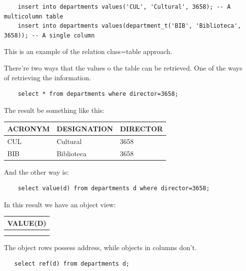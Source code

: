 \begin{lstlisting}
    insert into departments values('CUL', 'Cultural', 3658); -- A multicolumn table
    insert into departments values(department_t('BIB', 'Biblioteca', 3658)); -- A single column
\end{lstlisting}

This is an example of the relation class=table approach. 

There're two ways that the values o the table can be retrieved. One of the ways of retrieving the information. 

\begin{lstlisting}
    select * from departments where director=3658;
\end{lstlisting} 

The result be something like this:

\begin{table}[h]
    \centering
    \begin{tabular}{|l|l|l|}
        \hline
        ACRONYM & DESIGNATION & DIRECTOR \\ \hline
        CUL     & Cultural    & 3658     \\ \hline
        BIB     & Biblioteca  & 3658     \\ \hline
    \end{tabular}
\end{table}

And the other way is:

\begin{lstlisting}
    select value(d) from departments d where director=3658;
\end{lstlisting}

In this result we have an object view:

\begin{table}[h]
    \centering
    \begin{tabular}{|l|}
    \hline
    VALUE(D) \\ \hline
    [DEPARTMENT\_T] \\ \hline
    [DEPARTMENT\_T] \\ \hline
    \end{tabular}
\end{table}


The object rows possess address, while objects in columns don't. 

\begin{lstlisting}
   select ref(d) from departments d; 
\end{lstlisting} 

